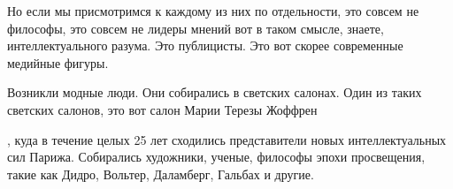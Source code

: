 Но если мы присмотримся к каждому из них по отдельности, это совсем не
философы, это совсем не лидеры мнений вот в таком смысле, знаете,
интеллектуального разума. Это публицисты. Это вот скорее современные медийные
фигуры. 


Возникли модные люди. Они собирались в светских салонах. Один из
таких светских салонов, это вот салон Марии Терезы Жоффрен


, куда в течение
целых 25 лет сходились представители новых интеллектуальных сил Парижа.
Собирались художники, ученые, философы эпохи просвещения, такие как Дидро,
Вольтер, Даламберг, Гальбах и другие. 


